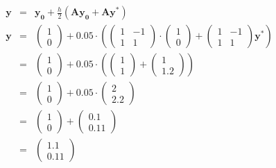 \documentclass[german, 10pt, a4paper, twocolumn]{scrartcl}
\theoremstyle{definition}
\begin{document}
\begin{eqnarray*}
	\mathbf{y} &	= &	\mathbf{y_0} + \frac{h}{2} (\mathbf{A}\mathbf{y_0} + \mathbf{A}\mathbf{y^*})\\
	\mathbf{y} &	= &	\left (
		\begin{array}{c}
			1 \\
			0
		\end{array}
	\right ) + 0.05 \cdotp \left ( \left (
		\begin{array}{cc}
			1 &	-1\\
			1 &	1
		\end{array}
		\right ) \cdotp \left (
		\begin{array}{c}
			1 \\
			0
		\end{array}
		\right )
		+
		\left (
		\begin{array}{cc}
			1 &	-1\\
			1 &	1
		\end{array}
		\right ) \mathbf{y^*} \right )\\
	&	= & \left  (
		\begin{array}{c}
			1 \\
			0
		\end{array}
		\right )
		+ 0.05 \cdotp \left ( \left (
		\begin{array}{c}
			1 \\
			1
		\end{array}
		\right ) + \left (
		\begin{array}{c}
			1 \\
			1.2
		\end{array}
		\right ) \right )\\
	&	= &
		\left (
		\begin{array}{c}
			1 \\
			0
		\end{array}
		\right )
		+ 0.05 \cdotp \left (
		\begin{array}{c}
			2 \\
			2.2
		\end{array}
		\right ) \\
	&	= & \left (
		\begin{array}{c}
			1 \\
			0
		\end{array}
		\right )
		+  \left (
		\begin{array}{c}
			0.1 \\
			0.11
		\end{array}
		\right ) \\
	&	= &
		\left (
		\begin{array}{c}
			1.1 \\
			0.11
		\end{array}
		\right )
\end{eqnarray*}
\end{document}

